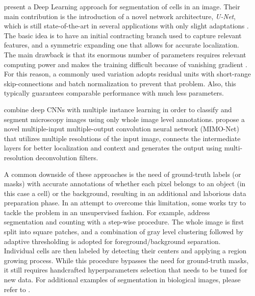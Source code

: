  present a Deep Learning approach for segmentation of cells in an image. 
Their main contribution is the introduction of a novel network architecture, \textit{U-Net}, which is still state-of-the-art in several applications with only slight adaptations \cite{masin2021novel, ritch2020axonet}. 
The basic idea is to have an initial contracting branch used to capture relevant features, and a symmetric expanding one that allows for accurate localization.
The main drawback is that its enormous number of parameters requires relevant computing power and makes the training difficult because of vanishing gradient \cite{vanishing_gradient}. 
For this reason, a commonly used variation adopts residual units \cite{residual_units} with short-range skip-connections and batch normalization to prevent that problem.
Also, this typically guarantees comparable performance with much less parameters.

 combine deep CNNs with multiple instance learning in order to classify and segment microscopy images using only whole image level annotations. 
 propose a novel multiple-input multiple-output convolution neural network (MIMO-Net) that utilizes multiple resolutions of the input image, connects the intermediate layers for better localization and context and generates the output using multi-resolution deconvolution filters.

A common downside of these approaches is  the need of ground-truth labels (or masks) with accurate annotations of whether each pixel belongs to an object (in this case a cell) or the background, resulting in an additional and laborious data preparation phase.
In an attempt to overcome this limitation, some works try to tackle the problem in an unsupervised fashion. For example,  address segmentation and counting with a step-wise procedure. The whole image is first split into square patches, and a combination of gray level clustering followed by adaptive thresholding is adopted for foreground/background separation. Individual cells are then labeled by detecting their centers and applying a region growing process. 
While this procedure bypasses the need for ground-truth masks, it still requires handcrafted hyperparameters selection that needs to be tuned for new data.
For additional examples of segmentation in biological images, please refer to .

